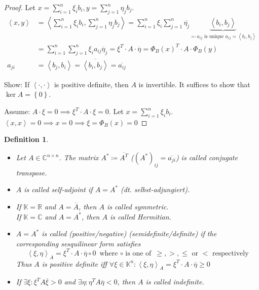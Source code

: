 \documentclass[a4paper]{article}
\newcounter{lecref}[section]
\numberwithin{lecref}{section}
\newtheorem{definition}[lecref]{Definition}
\newcommand{\set}[1]{\left\{#1\right\}}
\newcommand{\angel}[1]{\left\langle#1\right\rangle}
\begin{document}
\begin{proof}
  Let $x = \sum_{i=1}^n \xi_i b_i, y = \sum_{j=1}^n \eta_j b_{j}$.
  \begin{align*}
    \angel{x,y} &= \angel{\sum_{i=1}^n \xi_i b_i, \sum_{j=1}^n \eta_j b_j}
      = \sum_{i=1}^n \xi_i \sum_{j=1}^n \overline{\eta_j} \underbrace{\angel{b_i, b_j}}_{\eqqcolon a_{ij} \text{ is unique } a_{ij} = \angel{b_i, b_j}} \\
      &= \sum_{i=1}^n \sum_{j=1}^n \xi_i a_{ij} \overline{\eta}_j
      = \xi^T \cdot A \cdot \overline{\eta}
      = \Phi_B(x)^T \cdot A \cdot \Phi_B(y) \\
    a_{ji} &= \angel{b_j, b_i} = \overline{\angel{b_i, b_j}} = \overline{a_{ij}}
  \end{align*}

  Show: If $\angel{\cdot,\cdot}$ is positive definite, then $A$ is invertible.
  It suffices to show that $\operatorname{ker}{A} = \set{0}$.

  Assume: $A \cdot \xi = 0 \implies \xi^T \cdot A \cdot \xi = 0$.
  Let $x = \sum_{i=1}^n \xi_i b_i$. $\angel{x,x} = 0 \implies x = 0 \implies \xi = \Phi_B(x) = 0$
\end{proof}

\begin{definition}\hfill{} %
  \begin{itemize}
    \item 
      Let $A \in \mathbb C^{n \times n}$.
      The matrix $A^* \coloneqq \overline{A^T}$ ($(A^*)_{ij} = \overline{a_{ji}}$)
      is called \emph{conjugate transpose}.
    \item
      $A$ is called \emph{self-adjoint} if $A = A^*$ (dt. \foreignlanguage{german}{selbst-adjungiert}).
    \item
      If $\mathbb K = \mathbb R$ and $A = \overline{A}$, then $A$ is called \emph{symmetric}. \\
      If $\mathbb K = \mathbb C$ and $A = A^*$, then $A$ is called \emph{Hermitian}.
    \item
      $A = A^*$ is called (positive/negative) (semidefinite/definite) if the corresponding sesquilinear form satisfies
      \[ \angel{\xi, \eta}_A = \xi^T \cdot A \cdot \overline{\eta} \circ 0 \text{ where $\circ$ is one of } \geq, >, \leq \text{ or } < \text{ respectively} \]
      Thus $A$ is positive definite iff $\forall \xi \in \mathbb K^n: \angel{\xi, \eta}_A = \xi^T \cdot A \cdot \overline{\eta} \geq 0$
  
    \item If $\exists \xi: \xi^T A \overline{\xi} > 0$ and $\exists \eta: \eta^T A \overline{\eta} < 0$, then $A$ is called indefinite.
  \end{itemize}
\end{definition}
\end{document}
